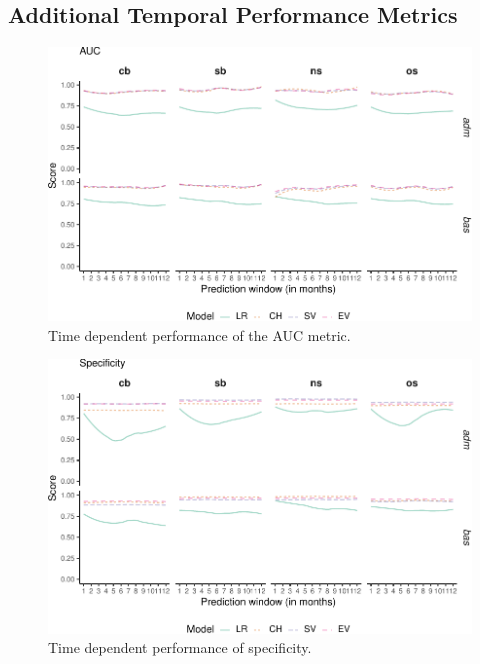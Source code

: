 \documentclass[a4paper,11pt]{article}
\begin{document}
\hypertarget{additional-temporal-performance-metrics}{%
\subsection*{Additional Temporal Performance Metrics}\label{additional-temporal-performance-metrics}}
\begin{figure}[H]

{\centering \includegraphics{thesis_files/figure-latex/apendix-time-auc-1} 

}

\caption[Time dependent performance of the AUC metric.]{Time dependent performance of the AUC metric.}\label{fig:apendix-time-auc}
\end{figure}
\begin{figure}[H]

{\centering \includegraphics{thesis_files/figure-latex/appendix-time-specificity-1} 

}

\caption[Time dependent performance of specificity.]{Time dependent performance of specificity.}\label{fig:appendix-time-specificity}
\end{figure}
\newpage
\end{document}
